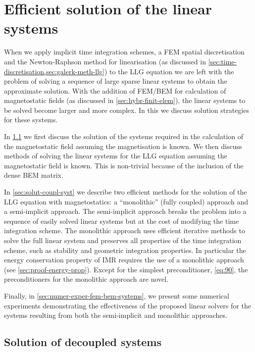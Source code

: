 \chapter{Efficient solution of the linear systems}
\label{sec:solution-strategies}

When we apply implicit time integration schemes, a FEM spatial discretisation and the Newton-Raphson method for linearisation (as discussed in \cref{sec:time-discretisation,sec:galerk-meth-llg}) to the LLG equation we are left with the problem of solving a sequence of large sparse linear systems to obtain the approximate solution.
With the addition of FEM/BEM for calculation of magnetostatic fields (as discussed in \cref{sec:hybr-finit-elem}), the linear systems to be solved become larger and more complex.
In this  we discuss solution strategies for these systems.

In \cref{sec:llg-only-system} we first discuss the solution of the systems required in the calculation of the magnetostatic field assuming the magnetisation is known.
We then discuss methods of solving the linear systems for the LLG equation assuming the magnetostatic field is known.
This is non-trivial because of the inclusion of the dense BEM matrix.

In \cref{sec:solut-coupl-syst} we describe two efficient methods for the solution of the LLG equation with magnetostatics: a ``monolithic'' (\ie fully coupled) approach and a semi-implicit approach.
The semi-implicit approach breaks the problem into a sequence of easily solved linear systems but at the cost of modifying the time integration scheme.
The monolithic approach uses efficient iterative methods to solve the full linear system and preserves all properties of the time integration scheme, such as stability and geometric integration properties.
In particular the energy conservation property of IMR requires the use of a monolithic approach (see \cref{sec:proof-energy-prop}).
Except for the simplest preconditioner, \cref{eq:90}, the preconditioners for the monolithic approach are novel.

Finally, in \cref{sec:numer-exper-fem-bem-systems}, we present some numerical experiments demonstrating the effectiveness of the proposed linear solvers for the systems resulting from both the semi-implicit and monolithic approaches.



\section{Solution of decoupled systems}
\label{sec:llg-only-system}

